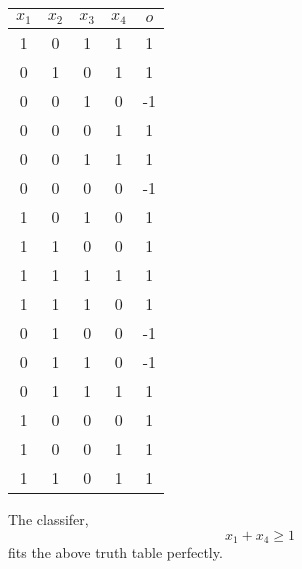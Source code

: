 \begin{enumerate}
	\begin{table}[h]
            \centering
            \begin{tabular}{cccc|c}
            $x_1$ & $x_2$ & $x_3$ & $x_4$ & $o$  \\ \hline
            1  & 0  & 1  & 1  & 1  \\
            0  & 1  & 0  & 1  & 1  \\
            0  & 0  & 1  & 0  & -1 \\
            0  & 0  & 0  & 1  & 1  \\
            0  & 0  & 1  & 1  & 1  \\
            0  & 0  & 0  & 0  & -1 \\
            1  & 0  & 1  & 0  & 1  \\
            1  & 1  & 0  & 0  & 1  \\
            1  & 1  & 1  & 1  & 1  \\
            1  & 1  & 1  & 0  & 1  \\
            0  & 1  & 0  & 0  & -1 \\
            0  & 1  & 1  & 0  & -1 \\
            0  & 1  & 1  & 1  & 1  \\
            1  & 0  & 0  & 0  & 1  \\
            1  & 0  & 0  & 1  & 1  \\
            1  & 1  & 0  & 1  & 1  \\
            \end{tabular}
        \end{table}

The classifer, \\
$$x_1 + x_4 \geq 1$$ fits the above truth table perfectly.

\end{enumerate}


